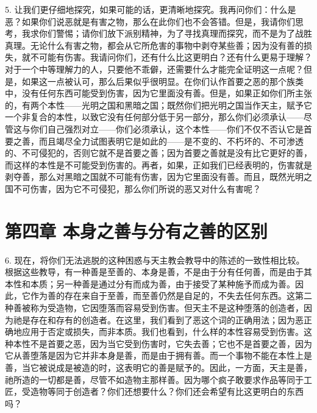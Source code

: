 5. 让我们更仔细地探究，如果可能的话，更清晰地探究。我再问你们：什么是恶？如果你们说恶就是有害之物，那么在此你们也不会答错。但是，我请你们思考，我求你们警惕；请你们放下派别精神，为了寻找真理而探究，而不是为了战胜真理。无论什么有害之物，都会从它所危害的事物中剥夺某些善；因为没有善的损失，就不可能有伤害。我请问你们，还有什么比这更明白？还有什么更易于理解？对于一个中等理解力的人，只要他不乖僻，还需要什么才能完全证明这一点呢？但是，如果这一点被认可，那么后果似乎很明显。在你们认作首要之恶的那个族类中，没有任何东西可能受到伤害，因为它里面没有善。但是，如果正如你们所主张的，有两个本性——光明之国和黑暗之国；既然你们把光明之国当作天主，赋予它一个非复合的本性，以致它没有任何部分低于另一部分，那么你们必须承认——尽管这与你们自己强烈对立——你们必须承认，这个本性——你们不仅不否认它是首要之善，而且竭尽全力试图表明它是如此的——是不变的、不朽坏的、不可渗透的、不可侵犯的，否则它就不是首要之善；因为首要之善就是没有比它更好的善，而这样的本性是不可能受到伤害的。再者，如果，正如我们已经表明的，伤害就是剥夺善，那么对黑暗之国就不可能有伤害，因为它里面没有善。而且，既然光明之国不可伤害，因为它不可侵犯，那么你们所说的恶又对什么有害呢？\par


\section{第四章 本身之善与分有之善的区别}

6. 现在，将你们无法逃脱的这种困惑与天主教会教导中的陈述的一致性相比较。根据这些教导，有一种善是至善的、本身是善，不是由于分有任何善，而是由于其本性和本质；另一种善是通过分有而成为善，由于接受了某种施予而成为善。因此，它作为善的存在来自于至善，而至善仍然是自足的，不失去任何东西。这第二种善被称为受造物，它因堕落而容易受到伤害。但天主不是这种堕落的创造者，因为祂是存在和存有的创造者。在这里，我们看到了恶这个词的正确用法；因为恶正确地应用于否定或损失，而非本质。我们也看到，什么样的本性容易受到伤害。这种本性不是首要之恶，因为当它受到伤害时，它失去善；它也不是首要之善，因为它从善堕落是因为它并非本身是善，而是由于拥有善。而一个事物不能在本性上是善，当它被说成是被造的时，这表明它的善是赋予的。因此，一方面，天主是善，祂所造的一切都是善，尽管不如造物主那样善。因为哪个疯子敢要求作品等同于工匠，受造物等同于创造者？你们还想要什么？你们还会希望有比这更明白的东西吗？\par


